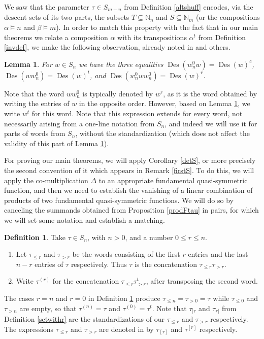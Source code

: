 \documentclass{article}
\newtheorem{lem}[thm]{Lemma}
\theoremstyle{definition}
\newtheorem{defn}[thm]{Definition}
\begin{document}
We saw that the parameter $\tau \in S_{m+n}$ from Definition \ref{altshuff} encodes, via the descent sets of its two parts, the subsets $T\subseteq\mathbb{N}_{n}$ and $S\subseteq\mathbb{N}_{m}$ (or the compositions $\alpha \vDash n$ and $\beta \vDash m$). In order to match this property with the fact that in our main theorems we relate a composition $\alpha$ with its transpositions $\alpha^{t}$ from Definition \ref{invdef}, we make the following observation, already noted in \cite{[Z1]} and others.
\begin{lem}
For $w \in S_{n}$ we have the three equalities $\operatorname{Des}(w^{0}_{n}w)=\operatorname{Des}(w)^{c}$, $\operatorname{Des}(ww^{0}_{n})=\operatorname{Des}(w)^{t}$, and $\operatorname{Des}(w^{0}_{n}ww^{0}_{n})=\operatorname{Des}(w)^{r}$. \label{opersDes}
\end{lem}
Note that the word $ww^{0}_{n}$ is typically denoted by $w^{r}$, as it is the word obtained by writing the entries of $w$ in the opposite order. However, based on Lemma \ref{opersDes}, we write $w^{t}$ for this word. Note that this expression extends for every word, not necessarily arising from a one-line notation from $S_{n}$, and indeed we will use it for parts of words from $S_{n}$, without the standardization (which does not affect the validity of this part of Lemma \ref{opersDes}).

\medskip

For proving our main theorems, we will apply Corollary \ref{detS}, or more precisely the second convention of it which appears in Remark \ref{firstS}. To do this, we will apply the co-multiplication $\Delta$ to an appropriate fundamental quasi-symmetric function, and then we need to establish the vanishing of a linear combination of products of two fundamental quasi-symmetric functions. We will do so by canceling the summands obtained from Proposition \ref{prodFtau} in pairs, for which we will set some notation and establish a matching.
\begin{defn}
Take $\tau \in S_{n}$, with $n>0$, and a number $0 \leq r \leq n$.
\begin{enumerate}[$(i)$]
\item Let $\tau_{\leq r}$ and $\tau_{>r}$ be the words consisting of the first $r$ entries and the last $n-r$ entries of $\tau$ respectively. Thus $\tau$ is the concatenation $\tau_{\leq r}\tau_{>r}$.
\item Write $\tau^{(r)}$ for the concatenation $\tau_{\leq r}\tau_{>r}^{t}$, after transposing the second word.
\end{enumerate} \label{taurdef}
\end{defn}
The cases $r=n$ and $r=0$ in Definition \ref{taurdef} produce $\tau_{\leq n}=\tau_{>0}=\tau$ while $\tau_{\leq 0}$ and $\tau_{>n}$ are empty, so that $\tau^{(n)}=\tau$ and $\tau^{(0)}=\tau^{t}$. Note that $\tau_{|r}$ and $\tau_{r|}$ from Definition \ref{setwithr} are the standardizations of our $\tau_{\leq r}$ and $\tau_{>r}$ respectively. The expressions $\tau_{\leq r}$ and $\tau_{>r}$ are denoted in \cite{[LM]} by $\tau_{[r]}$ and $\tau^{[r]}$ respectively.
\end{document}
